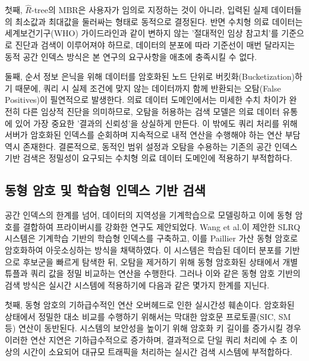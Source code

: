 \bigskip

첫째, $\hat{R}$-tree의 MBR은 사용자가 임의로 지정하는 것이 아니라, 입력된 실제 데이터들의 최소값과 최대값을 둘러싸는 형태로 동적으로 결정된다. 반면 수치형 의료 데이터는 세계보건기구(WHO) 가이드라인과 같이 변하지 않는 '절대적인 임상 참고치'를 기준으로 진단과 검색이 이루어져야 하므로, 데이터의 분포에 따라 기준선이 매번 달라지는 동적 공간 인덱스 방식은 본 연구의 요구사항을 애초에 충족시킬 수 없다.

\bigskip

둘째, 순서 정보 은닉을 위해 데이터를 암호화된 노드 단위로 버킷화(Bucketization)하기 때문에, 쿼리 시 실제 조건에 맞지 않는 데이터까지 함께 반환되는 오탐(False Positives)이 필연적으로 발생한다. 의료 데이터 도메인에서는 미세한 수치 차이가 완전히 다른 임상적 진단을 의미하므로, 오탐을 허용하는 검색 모델은 의료 데이터 유통에 있어 가장 중요한 '결과의 신뢰성'을 상실하게 만든다. 이 밖에도 쿼리 처리를 위해 서버가 암호화된 인덱스를 순회하며 지속적으로 내적 연산을 수행해야 하는 연산 부담 역시 존재한다. 결론적으로, 동적인 범위 설정과 오탐을 수용하는 기존의 공간 인덱스 기반 검색은 정밀성이 요구되는 수치형 의료 데이터 도메인에 적용하기 부적합하다.

\bigskip

\subsection{동형 암호 및 학습형 인덱스 기반 검색}
공간 인덱스의 한계를 넘어, 데이터의 지역성을 기계학습으로 모델링하고 이에 동형 암호를 결합하여 프라이버시를 강화한 연구도 제안되었다. Wang et al.\cite{wang2025}이 제안한 SLRQ 시스템은 기계학습 기반의 학습형 인덱스를 구축하고, 이를 Paillier 가산 동형 암호로 암호화하여 아웃소싱하는 방식을 채택하였다. 이 시스템은 학습된 데이터 분포를 기반으로 후보군을 빠르게 탐색한 뒤, 오탐을 제거하기 위해 동형 암호화된 상태에서 개별 튜플과 쿼리 값을 정밀 비교하는 연산을 수행한다. 그러나 이와 같은 동형 암호 기반의 검색 방식은 실시간 시스템에 적용하기에 다음과 같은 몇가지 한계를 지닌다.

\bigskip

첫째, 동형 암호의 기하급수적인 연산 오버헤드로 인한 실시간성 훼손이다. 암호화된 상태에서 정밀한 대소 비교를 수행하기 위해서는 막대한 암호문 프로토콜(SIC, SM 등) 연산이 동반된다. 시스템의 보안성을 높이기 위해 암호화 키 길이를 증가시킬 경우 이러한 연산 지연은 기하급수적으로 증가하며, 결과적으로 단일 쿼리 처리에 수 초 이상의 시간이 소요되어 대규모 트래픽을 처리하는 실시간 검색 시스템에 부적합하다.

\bigskip

